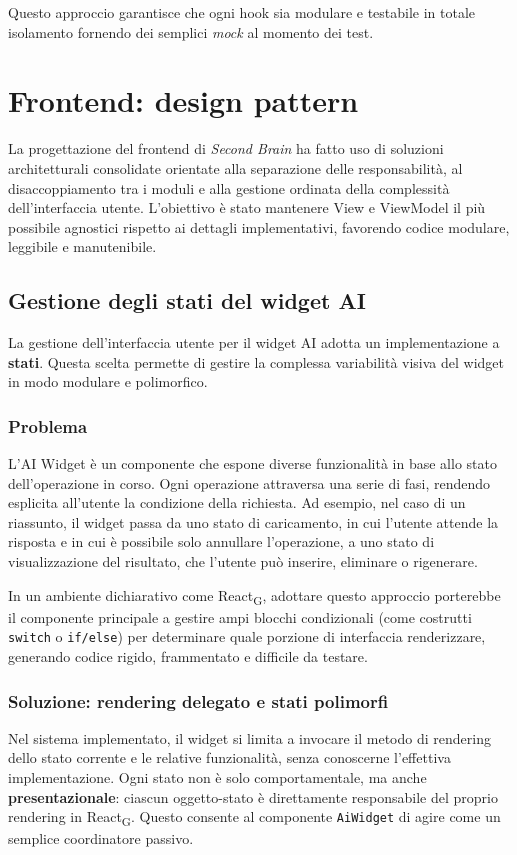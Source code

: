 \documentclass[11pt,a4paper]{article}
\newcommand{\gls}[1]{#1\textsubscript{G}}
\begin{document}
Questo approccio garantisce che ogni hook sia modulare e testabile in totale isolamento fornendo dei semplici \textit{mock} al momento dei test.


\newpage

\section{Frontend: design pattern}
La progettazione del frontend di \textit{Second Brain} ha fatto uso di soluzioni 
architetturali consolidate orientate alla separazione delle responsabilità, 
al disaccoppiamento tra i moduli e alla gestione ordinata della complessità 
dell'interfaccia utente. L'obiettivo è stato mantenere View e ViewModel il più 
possibile agnostici rispetto ai dettagli implementativi, favorendo codice 
modulare, leggibile e manutenibile.


\subsection{Gestione degli stati del widget AI}
La gestione dell'interfaccia utente per il widget AI adotta un implementazione a \textbf{stati}. Questa scelta permette di gestire la complessa variabilità visiva del widget in modo modulare e polimorfico.

\subsubsection{Problema}
L’AI Widget è un componente che espone diverse funzionalità in base allo stato dell’operazione in corso. Ogni operazione attraversa una serie di fasi, rendendo esplicita all’utente la condizione della richiesta. Ad esempio, nel caso di un riassunto, il widget passa da uno stato di caricamento, in cui l'utente attende la risposta e in cui è possibile solo annullare l'operazione, a uno stato di visualizzazione del risultato, che l’utente può inserire, eliminare o rigenerare.

In un ambiente dichiarativo come \gls{React}, adottare questo approccio porterebbe il componente principale a gestire ampi blocchi condizionali (come costrutti \texttt{switch} o \texttt{if/else}) per determinare quale porzione di interfaccia renderizzare, generando codice rigido, frammentato e difficile da testare.

\subsubsection{Soluzione: rendering delegato e stati polimorfi}
Nel sistema implementato, il widget si limita a invocare il metodo di rendering dello stato corrente e le relative funzionalità, senza conoscerne l’effettiva implementazione. Ogni stato non è solo comportamentale, ma anche \textbf{presentazionale}: ciascun oggetto-stato è direttamente responsabile del proprio rendering in \gls{React}. Questo consente al componente \texttt{AiWidget} di agire come un semplice coordinatore passivo.
\end{document}
